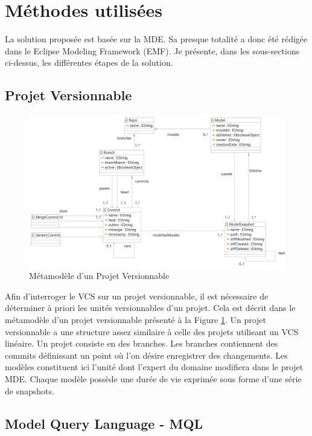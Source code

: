 \documentclass[12pt, titlepage]{article}
\begin{document}
\section*{Méthodes utilisées}

La solution proposée est basée sur la MDE. Sa presque totalité a donc été
rédigée dans le Eclipse Modeling Framework (EMF). Je présente, dans les
sous-sections ci-dessus, les différentes étapes de la solution.

\subsection*{Projet Versionnable}

\begin{figure}
  \centering
  \includegraphics[width=\textwidth]{repomm.png}
  \caption{Métamodèle d'un Projet Versionnable}
  \label{fig:repomm}
\end{figure}

Afin d'interroger le VCS sur un projet versionnable, il est nécessaire de
déterminer à priori les unités versionnables d'un projet. Cela est décrit dans
le métamodèle d'un projet versionnable présenté à la Figure \ref{fig:repomm}. Un
projet versionnable a une structure assez similaire à celle des projets
utilisant un VCS linéaire. Un projet consiste en des branches. Les branches
contiennent des commits définissant un point où l'on désire enregistrer des
changements. Les modèles constituent ici l'unité dont l'expert du domaine
modifiera dans le projet MDE. Chaque modèle possède une durée de vie exprimée
sous forme d'une série de snapshots.

\subsection*{Model Query Language - MQL}
\end{document}
